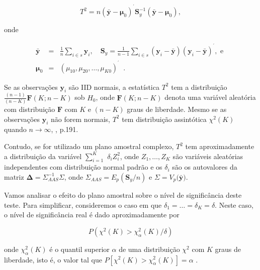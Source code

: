 \documentclass[]{book}
\numberwithin{example}{chapter}
\numberwithin{remark}{chapter}
\numberwithin{definition}{chapter}
\begin{document}
\begin{equation}
T^{2}=n\left( \mathbf{\bar{y}-\mu }_{0}\right) ^{^{\prime }}\mathbf{S}
_{y}^{-1}\left( \mathbf{\bar{y}-\mu }_{0}\right) , \label{eq:epa11} 
\end{equation}

onde

\begin{eqnarray*}
\mathbf{\bar{y}} &=&\frac{1}{n}\sum\limits_{i\in s}\mathbf{y}_{i},\quad 
\mathbf{S}_{y}=\frac{1}{n-1}\sum\limits_{i\in s}\left( \mathbf{y}_{i}-
\mathbf{\bar{y}}\right) \left( \mathbf{y}_{i}-\mathbf{\bar{y}}\right)
^{^{\prime }},\mbox{ e } \\
\mathbf{\mu }_{0} &=&\left( \mu _{10},\mu _{20},\ldots ,\mu _{K0}\right)
^{^{\prime }}\;\;.
\end{eqnarray*}

Se as observações \(\mathbf{y}_{i}\) são IID normais, a estatística
\(T^{2}\) tem a distribuição
\(\frac{\left( n-1\right) }{\left( n-K\right)}\mathbf{F}\left( K;n-K\right)\)
sob \(H_{0}\), onde \(\mathbf{F}\left( K;n-K\right)\) denota uma
variável aleatória com distribuição \(\mathbf{F}\) com \(K\) e
\(\left( n-K\right)\) graus de liberdade. Mesmo se as observações
\(\mathbf{y}_{i}\) não forem normais, \(T^{2}\) tem distribuição
assintótica \(\chi ^{2}\left(K\right)\) quando \(n\rightarrow \infty\),
\citep{Johnson}, p.191.

Contudo, se for utilizado um plano amostral complexo, \(T^{2}\) tem
aproximadamente a distribuição da variável \(\sum\limits_{i=1}^{K}\)
\(\delta _{i}Z_{i}^{2}\), onde \(Z_{1},\ldots ,Z_{K}\) são variáveis
aleatórias independentes com distribuição normal padrão e os
\(\delta _{i}\) são os autovalores da matriz
\(\mathbf{\Delta }=\Sigma _{AAS}^{-1}\Sigma\), onde
\(\Sigma _{AAS}=E_{p}(\mathbf{S}_{y}/n)\) e
\(\Sigma =V_{p}(\mathbf{\bar{y})}\).

Vamos analisar o efeito do plano amostral sobre o nível de significância
deste teste. Para simplificar, consideremos o caso em que
\(\delta _{1}=\ldots =\delta _{K}=\delta\). Neste caso, o nível de
significância real é dado aproximadamente por

\begin{equation}
P\left(\chi ^{2}\left( K\right) >\chi _{\alpha }^{2}\left( K\right) /\delta\right)  \label{eq:epa12}
\end{equation}

onde \(\chi _{\alpha }^{2}\left( K\right)\) é o quantil superior
\(\alpha\) de uma distribuição \(\chi ^{2}\) com \(K\) graus de
liberdade, isto é, o valor tal que
\(P\left[ \chi ^{2}\left( K\right) >\chi _{\alpha}^{2}\left( K\right) \right] =\alpha\)
.
\end{document}

